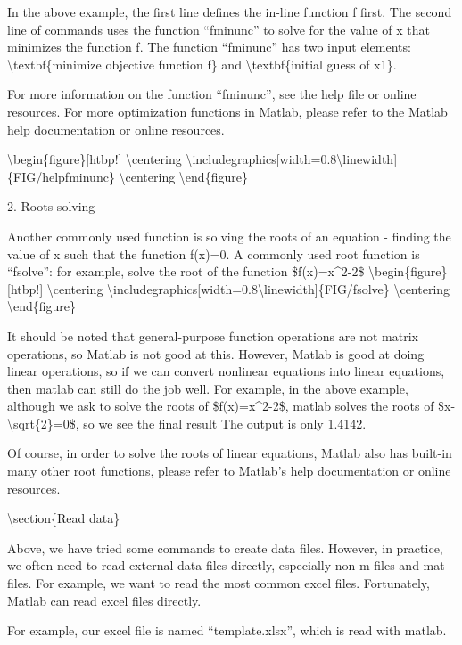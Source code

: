\documentclass[10pt,math=newtx,citestyle=gb7714-2015,bibstyle=gb7714-2015]{elegantbook}
\begin{document}
	In the above example, the first line defines the in-line function f first. The second line of commands uses the function ``fminunc'' to solve for the value of x that minimizes the function f. The function ``fminunc'' has two input elements: \textbackslash{}textbf\{minimize objective function f\} and \textbackslash{}textbf\{initial guess of x1\}.
	
	For more information on the function ``fminunc'', see the help file or online resources. For more optimization functions in Matlab, please refer to the Matlab help documentation or online resources.
	
	\textbackslash{}begin\{figure\}[htbp!]
	\textbackslash{}centering
	\textbackslash{}includegraphics[width=0.8\textbackslash{}linewidth]\{FIG/helpfminunc\}
	\textbackslash{}centering
	\textbackslash{}end\{figure\}
	
	2. Roots-solving 
	
	Another commonly used function is solving the roots of an equation - finding the value of x such that the function f(x)=0. A commonly used root function is ``fsolve'': for example, solve the root of the function \$f(x)=x\^{}2-2\$	
	\textbackslash{}begin\{figure\}[htbp!]
	\textbackslash{}centering
	\textbackslash{}includegraphics[width=0.8\textbackslash{}linewidth]\{FIG/fsolve\}
	\textbackslash{}centering
	\textbackslash{}end\{figure\}
	
	It should be noted that general-purpose function operations are not matrix operations, so Matlab is not good at this. However, Matlab is good at doing linear operations, so if we can convert nonlinear equations into linear equations, then matlab can still do the job well. For example, in the above example, although we ask to solve the roots of \$f(x)=x\^{}2-2\$, matlab solves the roots of \$x-\textbackslash{}sqrt\{2\}=0\$, so we see the final result The output is only 1.4142.
	
	Of course, in order to solve the roots of linear equations, Matlab also has built-in many other root functions, please refer to Matlab's help documentation or online resources.
	
	\textbackslash{}section\{Read data\}
	
	Above, we have tried some commands to create data files. However, in practice, we often need to read external data files directly, especially non-m files and mat files. For example, we want to read the most common excel files. Fortunately, Matlab can read excel files directly.
	
	For example, our excel file is named ``template.xlsx'', which is read with matlab.
	
\end{document}

